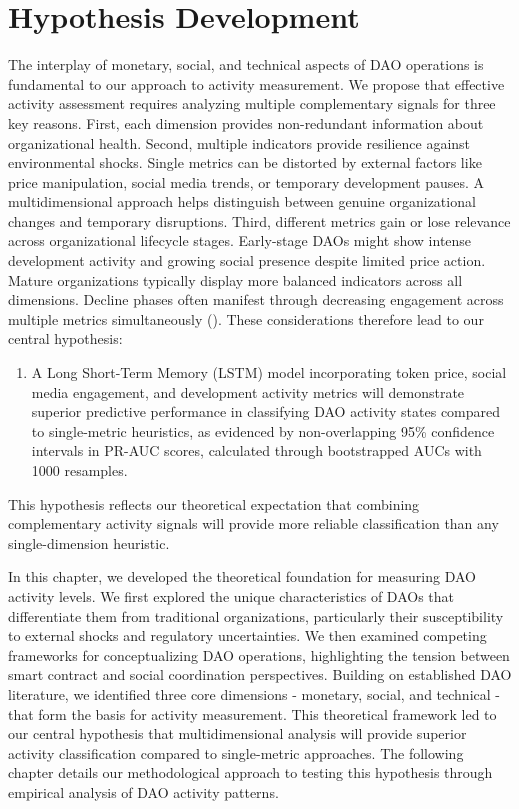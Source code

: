 \section{Hypothesis Development}
The interplay of monetary, social, and technical aspects of DAO operations is fundamental to our approach to activity measurement. We propose that effective activity assessment requires analyzing multiple complementary signals for three key reasons.
First, each dimension provides non-redundant information about organizational health.
Second, multiple indicators provide resilience against environmental shocks. Single metrics can be distorted by external factors like price manipulation, social media trends, or temporary development pauses. A multidimensional approach helps distinguish between genuine organizational changes and temporary disruptions.
Third, different metrics gain or lose relevance across organizational lifecycle stages. Early-stage DAOs might show intense development activity and growing social presence despite limited price action. Mature organizations typically display more balanced indicators across all dimensions. Decline phases often manifest through decreasing engagement across multiple metrics simultaneously  (\cite{lester2003organizational}).
These considerations therefore lead to our central hypothesis:
\begin{enumerate}
    \item A Long Short-Term Memory (LSTM) model incorporating token price, social media engagement, and development activity metrics will demonstrate superior predictive performance in classifying DAO activity states compared to single-metric heuristics, as evidenced by non-overlapping 95\% confidence intervals in PR-AUC scores, calculated through bootstrapped AUCs with 1000 resamples.
\end{enumerate}
\noindent This hypothesis reflects our theoretical expectation that combining complementary activity signals will provide more reliable classification than any single-dimension heuristic.





In this chapter, we developed the theoretical foundation for measuring DAO activity levels. We first explored the unique characteristics of DAOs that differentiate them from traditional organizations, particularly their susceptibility to external shocks and regulatory uncertainties. We then examined competing frameworks for conceptualizing DAO operations, highlighting the tension between smart contract and social coordination perspectives. Building on established DAO literature, we identified three core dimensions - monetary, social, and technical - that form the basis for activity measurement. This theoretical framework led to our central hypothesis that multidimensional analysis will provide superior activity classification compared to single-metric approaches. The following chapter details our methodological approach to testing this hypothesis through empirical analysis of DAO activity patterns.
